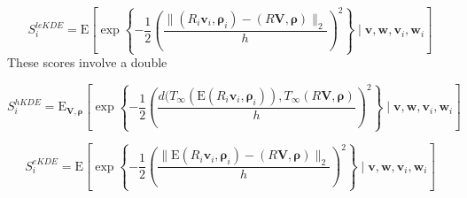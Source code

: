 \begin{equation}
    \label{eqn:ad_kde_mel}
    S_i^{leKDE} = \text{E}\left[
    \exp\left\lbrace
    -\frac{1}{2}\left(
    \frac{\lVert(R_i\bm{v}_i,\bm{\rho}_i) - (R\bm{V},\bm{\rho})\rVert_2}{h}
    \right)^2
    \right\rbrace
    \mid
    \bm{v},\bm{w},\bm{v}_i,\bm{w}_i
    \right]
\end{equation}
These scores involve a double 



\begin{equation}
    \label{eqn:ad_kde_mh}
    S_i^{hKDE} = \text{E}_{\bm{V},\bm{\rho}}\left[
    \exp\left\lbrace
    -\frac{1}{2}\left(
    \frac{d(T_{\infty}(\text{E}(R_i\bm{v}_i,\bm{\rho}_i)), T_{\infty}(R\bm{V},\bm{\rho})}{h}
    \right)^2
    \right\rbrace 
    \mid \bm{v},\bm{w},\bm{v}_i, \bm{w}_i\right]
\end{equation}

\begin{equation}
    \label{eqn:ad_kde_me}
    S_i^{eKDE} = \text{E}\left[
    \exp\left\lbrace
    -\frac{1}{2}\left(
    \frac{\lVert\text{E}(R_i\bm{v}_i,\bm{\rho}_i) - (R\bm{V},\bm{\rho})\rVert_2}{h}
    \right)^2
    \right\rbrace
    \mid
    \bm{v},\bm{w},\bm{v}_i,\bm{w}_i
    \right]
\end{equation}

